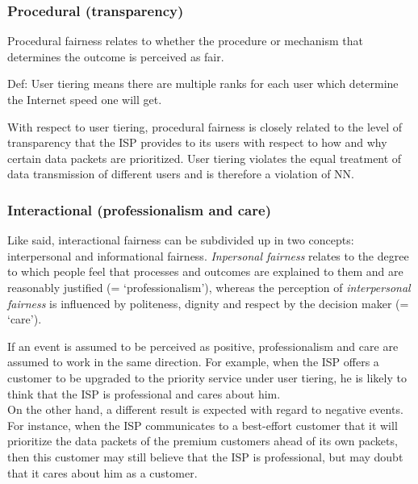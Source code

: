 \subsubsection{Procedural (transparency)}
Procedural fairness relates to whether the procedure or mechanism that determines the outcome is perceived as fair.

Def: User tiering means there are multiple ranks for each user which determine the Internet speed one will get.

With respect to user tiering, procedural fairness is closely related to the level of transparency that the ISP provides to its users with respect to how and why certain data packets are prioritized. User tiering violates the equal treatment of data transmission of different users and is therefore a violation of NN.

\subsubsection{Interactional (professionalism and care)}
Like said, interactional fairness can be subdivided up in two concepts: interpersonal and informational fairness. \emph{Inpersonal fairness} relates to the degree to which people feel that processes and outcomes are explained to them and are reasonably justified (= `professionalism'), whereas the perception of \emph{interpersonal fairness} is influenced by politeness, dignity and respect by the decision maker (= `care').

If an event is assumed to be perceived as positive, professionalism and care are assumed to work in the same direction. For example, when the ISP offers a customer to be upgraded to the priority service under user tiering, he is likely to think that the ISP is professional and cares about him.\\
On the other hand, a different result is expected with regard to negative events. For instance, when the ISP communicates to a best-effort customer that it will prioritize the data packets of the premium customers ahead of its own packets, then this customer may still believe that the ISP is professional, but may doubt that it cares about him as a customer.